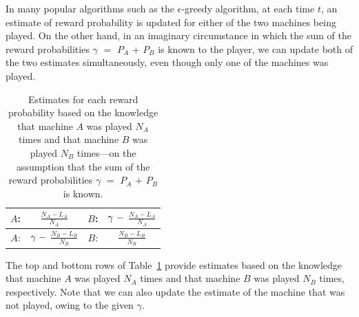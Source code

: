 \documentclass[twocolumn,showpacs,preprintnumbers,amsmath,amssymb]{revtex4}
\begin{document}
In many popular algorithms such as the $\epsilon$-greedy algorithm, at each time $t$, an estimate of reward probability is updated for either of the two machines being played.
On the other hand, in an imaginary circumstance in which the sum of the reward probabilities $\gamma$ $=$ $P_A$ $+$ $P_B$ is known to the player, we can update both of the two estimates simultaneously, even though only one of the machines was played.

\begin{table}[h]
\caption{Estimates for each reward probability based on the knowledge that machine $A$ was played $N_A$ times and that machine $B$ was played $N_B$ times---on the assumption that the sum of the reward probabilities $\gamma$ $=$ $P_A$ $+$ $P_B$ is known.}
\label{table:1}
\begin{center}
\begin{tabular}{|c|c|c|c|}\hline \hline
$A$: & $\frac{N_A - L_A}{N_A}$ & $B$: & $\gamma \hspace{1mm} -$ $\frac{N_A - L_A}{N_A}$ \\ \hline
$A$: & $\gamma \hspace{1mm} -$ $\frac{N_B - L_B}{N_B}$ & $B$: & $\frac{N_B - L_B}{N_B}$ \\ \hline
\end{tabular}
\end{center}
\end{table}
The top and bottom rows of Table~\ref{table:1} provide estimates based on the knowledge that machine $A$ was played $N_A$ times and that machine $B$ was played $N_B$ times, respectively.
Note that we can also update the estimate of the machine that was not played, owing to the given $\gamma$.
 
\end{document}
